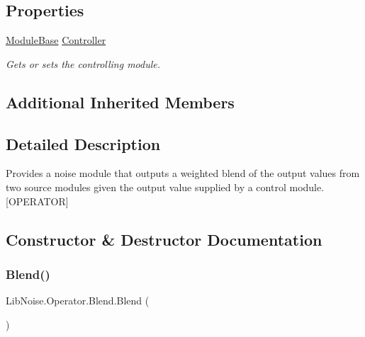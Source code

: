 \subsection*{Properties}
\begin{DoxyCompactItemize}
\item 
\hyperlink{class_lib_noise_1_1_module_base}{Module\+Base} \hyperlink{class_lib_noise_1_1_operator_1_1_blend_af613e7feba968e5a94fa3d16c4b47b10}{Controller}
\begin{DoxyCompactList}\small\item\em Gets or sets the controlling module. \end{DoxyCompactList}\end{DoxyCompactItemize}
\subsection*{Additional Inherited Members}


\subsection{Detailed Description}
Provides a noise module that outputs a weighted blend of the output values from two source modules given the output value supplied by a control module. \mbox{[}O\+P\+E\+R\+A\+T\+OR\mbox{]} 



\subsection{Constructor \& Destructor Documentation}
\mbox{\label{class_lib_noise_1_1_operator_1_1_blend_a9a9c47ac7c367d406ac74ec13887a716}} 
\subsubsection{\texorpdfstring{Blend()}{Blend()}\hspace{0.1cm}{\footnotesize\ttfamily [1/2]}}
{\footnotesize\ttfamily Lib\+Noise.\+Operator.\+Blend.\+Blend (\begin{DoxyParamCaption}{ }\end{DoxyParamCaption})}



